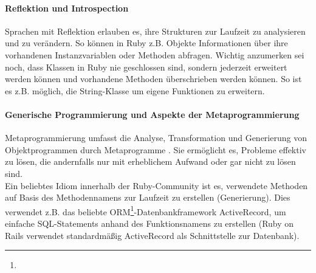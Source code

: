 \paragraph{Reflektion und Introspection} Sprachen mit Reflektion erlauben es, ihre Strukturen zur Laufzeit zu analysieren und zu verändern. So können in Ruby z.B. Objekte Informationen über ihre vorhandenen Instanzvariablen oder Methoden abfragen. Wichtig anzumerken sei noch, dass Klassen in Ruby nie geschlossen sind, sondern jederzeit erweitert werden können und vorhandene Methoden überschrieben werden können. So ist es z.B. möglich, die String-Klasse um eigene Funktionen zu erweitern.

%
%
%
\begin{ruby}[label=IRB]
 
   
     
  

\end{ruby}

\paragraph{Generische Programmierung und Aspekte der Metaprogrammierung}
Metaprogrammierung umfasst die Analyse, Transformation und Generierung von Objektprogrammen durch Metaprogramme \citep{herrmann_2005}.  Sie ermöglicht es, Probleme effektiv zu lösen, die andernfalls nur mit erheblichem Aufwand oder gar nicht zu lösen sind.\\
Ein beliebtes Idiom innerhalb der Ruby-Community ist es, verwendete Methoden auf Basis des Methodennamens zur Laufzeit zu erstellen (Generierung). Dies verwendet z.B. das beliebte ORM\footnote{}-Datenbankframework ActiveRecord, um einfache SQL-Statements anhand des Funktionsnamens zu erstellen (Ruby on Rails verwendet standardmäßig ActiveRecord als Schnittstelle zur Datenbank).
\begin{ruby}[label=IRB]
\end{ruby}


